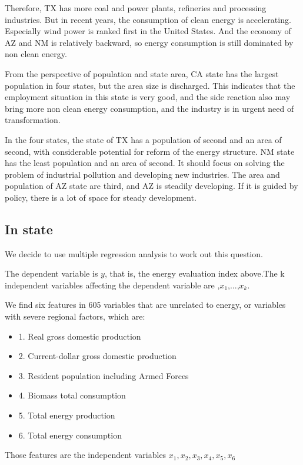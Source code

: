 \documentclass[a4paper]{article}
\begin{document}
Therefore, TX has more coal and power plants, refineries and processing industries. But in recent years, the consumption of clean energy is accelerating. Especially wind power is ranked first in the United States. And the economy of AZ and NM is relatively backward, so energy consumption is still dominated by non clean energy.

From the perspective of population and state area, CA state has the largest population in four states, but the area size is discharged. This indicates that the employment situation in this state is very good, and the side reaction also may bring more non clean energy consumption, and the industry is in urgent need of transformation. 

In the four states, the state of TX has a population of second and an area of second, with considerable potential for reform of the energy structure. NM state has the least population and an area of second. It should focus on solving the problem of industrial pollution and developing new industries. The area and population of AZ state are third, and AZ is steadily developing. If it is guided by policy, there is a lot of space for steady development.

\subsection{In state}

We decide to use multiple regression analysis to work out this question.\cite{mr1}

The dependent variable is $y$, that is, the energy evaluation index above.The k independent variables affecting the dependent variable are ,$x_1$,...,$x_k$.

We find six features in 605 variables that are unrelated to energy, or variables with severe regional factors, which are:
\begin{itemize}
\item 1. Real gross domestic production
\item 2. Current-dollar gross domestic production
\item 3. Resident population including Armed Forces
\item 4. Biomass total consumption
\item 5. Total energy production
\item 6. Total energy consumption
\end{itemize}

Those features are the independent variables $x_1, x_2, x_3, x_4, x_5, x_6$
\end{document}
